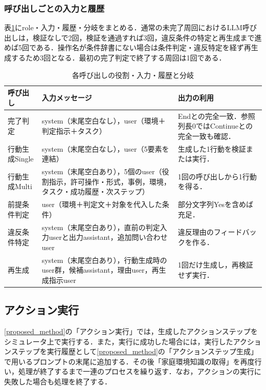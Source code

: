 \subsubsection{呼び出しごとの入力と履歴}\label{sec4.prompt_calls}
表\ref{tab:prompt_calls}にrole・入力・履歴・分岐をまとめる．通常の未完了周回におけるLLM呼び出しは，検証なしで2回，検証を通過すれば3回，違反条件の特定と再生成まで進めば5回である．操作名が条件辞書にない場合は条件判定・違反特定を経ず再生成するため3回となる．最初の完了判定で終了する周回は1回である．

\begin{table}[tb]
\caption{各呼び出しの役割・入力・履歴と分岐}\label{tab:prompt_calls}
\centering\small
\begin{tabular}{p{}p{}p{}}
\hline
呼び出し & 入力メッセージ & 出力の利用 \\
\hline
完了判定 & system（末尾空白なし），user（環境＋判定指示＋タスク） & Endとの完全一致．参照列長0ではContinueとの完全一致も確認．\\
行動生成Single & system（末尾空白なし），user（5要素を連結） & 生成した1行動を検証または実行．\\
行動生成Multi & system（末尾空白あり），5個のuser（役割指示，許可操作・形式，事例，環境，タスク・成功履歴・次ステップ） & 1回の呼び出しから1行動を得る．\\
前提条件判定 & user（環境＋判定文＋対象を代入した条件） & 部分文字列Yesを含めば充足．\\
違反条件特定 & system（末尾空白あり），直前の判定入力userと出力assistant，追加問い合わせuser & 違反理由のフィードバックを作る．\\
再生成 & system（末尾空白あり），行動生成時のuser群，候補assistant，理由user，再生成指示user & 1回だけ生成し，再検証せず実行．\\
\hline
\end{tabular}
\end{table}

\subsection{アクション実行} \label{sec4.5}
\ref{proposed_method}の「アクション実行」では，生成したアクションステップをシミュレータ上で実行する．また，実行に成功した場合には，実行したアクションステップを実行履歴として\ref{proposed_method}の「アクションステップ生成」で用いるプロンプトの末尾に追加する．その後「家庭環境知識の取得」を再度行い，処理が終了するまで一連のプロセスを繰り返す．なお，アクションの実行に失敗した場合も処理を終了する．

